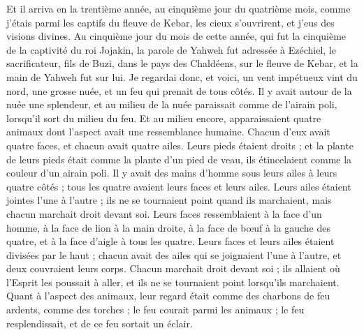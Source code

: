 \begin{multicols}{2}
\VerseOne{}Et il arriva en la trentième année, au cinquième jour du quatrième mois, comme j'étais parmi les captifs du fleuve de Kebar, les cieux s’ouvrirent, et j’eus des visions divines.
Au cinquième jour du mois de cette année, qui fut la cinquième de la captivité du roi Jojakin,
la parole de Yahweh fut adressée à Ezéchiel, le sacrificateur, fils de Buzi, dans le pays des Chaldéens, sur le fleuve de Kebar, et la main de Yahweh fut sur lui.
Je regardai donc, et voici, un vent impétueux vint du nord, une grosse nuée, et un feu qui prenait de tous côtés. Il y avait autour de la nuée une splendeur, et au milieu de la nuée paraissait comme de l’airain poli, lorsqu’il sort du milieu du feu.
Et au milieu encore, apparaissaient quatre animaux dont l’aspect avait une ressemblance humaine.
Chacun d'eux avait quatre faces, et chacun avait quatre ailes.
Leurs pieds étaient droits ; et la plante de leurs pieds était comme la plante d'un pied de veau, ils étincelaient comme la couleur d'un airain poli.
Il y avait des mains d'homme sous leurs ailes à leurs quatre côtés ; tous les quatre avaient leurs faces et leurs ailes.
Leurs ailes étaient jointes l'une à l'autre ; ils ne se tournaient point quand ils marchaient, mais chacun marchait droit devant soi.
Leurs faces ressemblaient à la face d'un homme, à la face de lion à la main droite, à la face de bœuf à la gauche des quatre, et à la face d'aigle à tous les quatre.
Leurs faces et leurs ailes étaient divisées par le haut ; chacun avait des ailes qui se joignaient l'une à l'autre, et deux couvraient leurs corps.
Chacun marchait droit devant soi ; ils allaient où l’Esprit les poussait à aller, et ils ne se tournaient point lorsqu'ils marchaient.
Quant à l’aspect des animaux, leur regard était comme des charbons de feu ardents, comme des torches ; le feu courait parmi les animaux ; le feu resplendissait, et de ce feu sortait un éclair.

\end{multicols}
